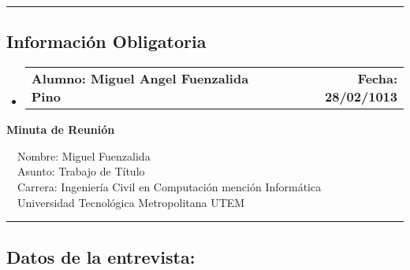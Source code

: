 \documentclass[10pt,letterpaper]{article}
\makeatletter
\newcommand{\headerrow}[2]
{\begin{tabular*}{\linewidth}{l@{\extracolsep{\fill}}r}
	#1 &
	#2 \\
\end{tabular*}}
\makeatother
\begin{document}
\hrule
\vspace{-0.4em}
\subsection*{Información Obligatoria}

\begin{itemize}
	\parskip=0.1em

	\item 
	\headerrow
		{\textbf{Alumno: Miguel Angel Fuenzalida Pino}}
		{\textbf{Fecha: 28/02/1013}}

\end{itemize}
\newpage
\begin{center}
{\LARGE \textbf{Minuta de Reunión}}

\ \ \textbullet Nombre: Miguel Fuenzalida
\\
\ \ \textbullet Asunto: Trabajo de Título
\\
\ \ \textbullet Carrera: Ingeniería Civil en Computación mención Informática
\\
\ \ \textbullet Universidad Tecnológica Metropolitana UTEM
\end{center}

\hrule
\vspace{-0.4em}
\subsection*{Datos de la entrevista:}
\end{document}
